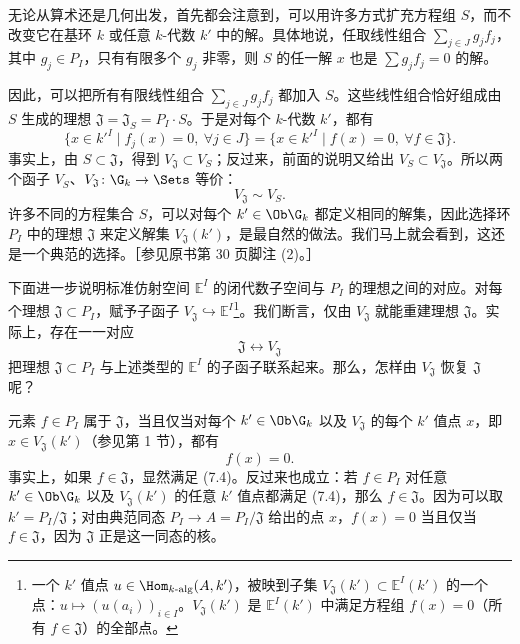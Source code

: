 无论从算术还是几何出发，首先都会注意到，可以用许多方式扩充方程组 $S$，而不改变它在基环 $k$ 或任意 $k$-代数 $k'$ 中的解。具体地说，任取线性组合 $\sum_{j\in J}g_jf_j$，其中 $g_j\in P_I$，只有有限多个 $g_j$ 非零，则 $S$ 的任一解 $x$ 也是 $\sum g_jf_j=0$ 的解。

因此，可以把所有有限线性组合 $\sum_{j\in J}g_jf_j$ 都加入 $S$。这些线性组合恰好组成由 $S$ 生成的理想 $\mathfrak J=\mathfrak J_S=P_I\cdot S$。于是对每个 $k$-代数 $k'$，都有
\begin{equation}\tag{7.1}\{x\in k'^I\mid f_j(x)=0,\ \forall j\in J\}=\{x\in k'^I\mid f(x)=0,\ \forall f\in\mathfrak J\}.
\end{equation}
事实上，由 $S\subset\mathfrak J$，得到 $V_{\mathfrak J}\subset V_S$；反过来，前面的说明又给出 $V_S\subset V_{\mathfrak J}$。所以两个函子 $V_S$、$V_{\mathfrak J}\colon\G_k\to\Sets$ 等价：
\begin{equation}\tag{7.2}V_{\mathfrak J}\sim V_S.
\end{equation}
许多不同的方程集合 $S$，可以对每个 $k'\in\Ob\G_k$ 都定义相同的解集，因此选择环 $P_I$ 中的理想 $\mathfrak J$ 来定义解集 $V_{\mathfrak J}(k')$，是最自然的做法。我们马上就会看到，这还是一个典范的选择。［参见原书第 30 页脚注 (2)。］

下面进一步说明标准仿射空间 $\mathbb E^I$ 的闭代数子空间与 $P_I$ 的理想之间的对应。对每个理想 $\mathfrak J\subset P_I$，赋予子函子 $V_{\mathfrak J}\hookrightarrow\mathbb E^I$\footnote{一个 $k'$ 值点 $u\in\Hom_{k\text{-alg}}(A,k')$，被映到子集 $V_{\mathfrak J}(k')\subset\mathbb E^I(k')$ 的一个点：$u\mapsto(u(a_i))_{i\in I}$。$V_{\mathfrak J}(k')$ 是 $\mathbb E^I(k')$ 中满足方程组 $f(x)=0$（所有 $f\in\mathfrak J$）的全部点。}。我们断言，仅由 $V_{\mathfrak J}$ 就能重建理想 $\mathfrak J$。实际上，存在一一对应
\begin{equation}\tag{7.3}\mathfrak J\longleftrightarrow V_{\mathfrak J}
\end{equation}
把理想 $\mathfrak J\subset P_I$ 与上述类型的 $\mathbb E^I$ 的子函子联系起来。那么，怎样由 $V_{\mathfrak J}$ 恢复 $\mathfrak J$ 呢？

元素 $f\in P_I$ 属于 $\mathfrak J$，当且仅当对每个 $k'\in\Ob\G_k$ 以及 $V_{\mathfrak J}$ 的每个 $k'$ 值点 $x$，即 $x\in V_{\mathfrak J}(k')$（参见第 1 节），都有
\begin{equation}\tag{7.4}f(x)=0.
\end{equation}
事实上，如果 $f\in\mathfrak J$，显然满足 (7.4)。反过来也成立：若 $f\in P_I$ 对任意 $k'\in\Ob\G_k$ 以及 $V_{\mathfrak J}(k')$ 的任意 $k'$ 值点都满足 (7.4)，那么 $f\in\mathfrak J$。因为可以取 $k'=P_I/\mathfrak J$；对由典范同态 $P_I\to A=P_I/\mathfrak J$ 给出的点 $x$，$f(x)=0$ 当且仅当 $f\in\mathfrak J$，因为 $\mathfrak J$ 正是这一同态的核。

